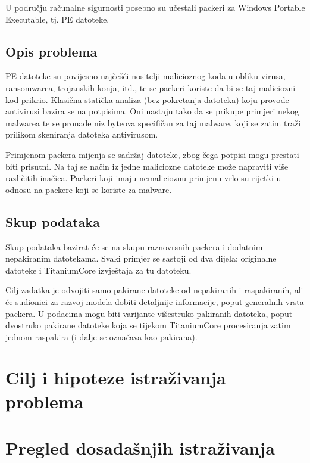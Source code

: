 \documentclass[paper=a4, fontsize=11pt]{scrartcl} %
\numberwithin{equation}{section} %
\numberwithin{figure}{section} %
\numberwithin{table}{section} %
\begin{document}
U području računalne sigurnosti posebno su učestali packeri za Windows Portable Executable, tj. PE datoteke.

\vspace{3mm}

\subsection{Opis problema}

PE datoteke su povijesno najčešći nositelji malicioznog koda u obliku virusa, ransomwarea,
trojanskih konja, itd., te se packeri koriste da bi se taj maliciozni kod prikrio. Klasična statička
analiza (bez pokretanja datoteka) koju provode antivirusi bazira se na potpisima. Oni nastaju
tako da se prikupe primjeri nekog malwarea te se pronađe niz byteova specifičan za taj malware, koji se zatim traži prilikom skeniranja datoteka antivirusom.


\vspace{3mm}


Primjenom packera mijenja se sadržaj datoteke, zbog čega potpisi mogu prestati biti prisutni.
Na taj se način iz jedne maliciozne datoteke može napraviti više različitih inačica. Packeri koji
imaju nemalicioznu primjenu vrlo su rijetki u odnosu na packere koji se koriste za malware.

\subsection{Skup podataka}

Skup podataka bazirat će se na skupu raznovrsnih packera i dodatnim nepakiranim
datotekama. Svaki primjer se sastoji od dva dijela: originalne datoteke i TitaniumCore
izvještaja za tu datoteku.

\vspace{3mm}

Cilj zadatka je odvojiti samo pakirane datoteke od nepakiranih i raspakiranih, ali će sudionici za
razvoj modela dobiti detaljnije informacije, poput generalnih vrsta packera. U podacima mogu
biti varijante višestruko pakiranih datoteka, poput dvostruko pakirane datoteke koja se tijekom
TitaniumCore procesiranja zatim jednom raspakira (i dalje se označava kao pakirana).

\section{Cilj i hipoteze istraživanja problema}


\section{Pregled dosadašnjih istraživanja}
\end{document}
